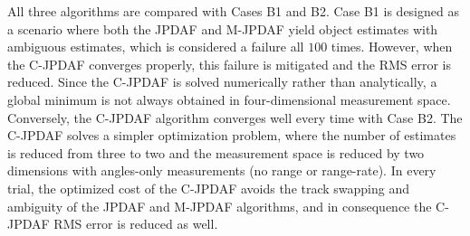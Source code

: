 All three algorithms are compared with Cases B1 and B2. Case B1 is designed as a scenario where both the JPDAF and M-JPDAF yield object estimates with ambiguous estimates, which is considered a failure all $100$ times.
However, when the C-JPDAF converges properly, this failure is mitigated and the RMS error is reduced.
Since the C-JPDAF is solved numerically rather than analytically, a global minimum is not always obtained in four-dimensional measurement space.
Conversely, the C-JPDAF algorithm converges well every time with Case B2. The C-JPDAF solves a simpler optimization problem, where the number of estimates is reduced from three to two and the measurement space is reduced by two dimensions with angles-only measurements (no range or range-rate).
In every trial, the optimized cost of the C-JPDAF avoids the track swapping and ambiguity of the JPDAF and M-JPDAF algorithms, and in consequence the C-JPDAF RMS error is reduced as well.

